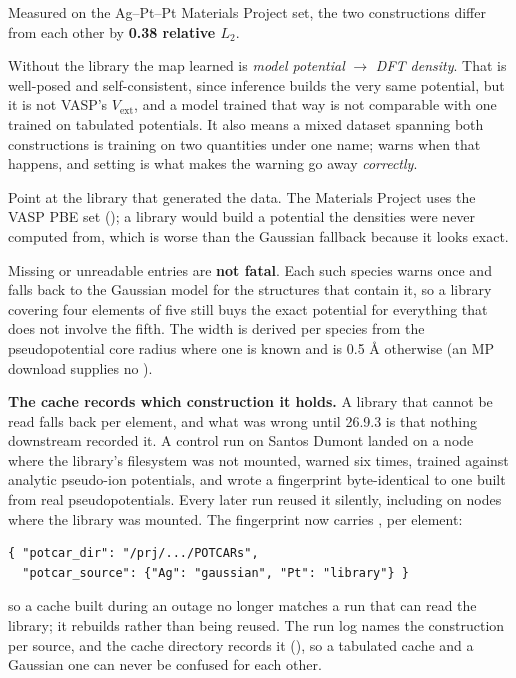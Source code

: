 Measured on the Ag--Pt--Pt Materials Project set, the two constructions differ from each other by \textbf{0.38 relative $L_2$}.

Without the library the map learned is \emph{model potential} $\to$ \emph{DFT density}. That is well-posed and self-consistent, since inference builds the very same potential, but it is not VASP's $V_\mathrm{ext}$, and a model trained that way is not comparable with one trained on tabulated potentials. It also means a mixed dataset spanning both constructions is training on two quantities under one name;  warns when that happens, and setting  is what makes the warning go away \emph{correctly}.

\begin{pwarn}
Point at the library that generated the data. The Materials Project uses the VASP PBE set (); a  library would build a potential the densities were never computed from, which is worse than the Gaussian fallback because it looks exact.
\end{pwarn}

Missing or unreadable entries are \textbf{not fatal}. Each such species warns once and falls back to the Gaussian model for the structures that contain it, so a library covering four elements of five still buys the exact potential for everything that does not involve the fifth. The width is derived per species from the pseudopotential core radius where one is known and is 0.5 \AA{} otherwise (an MP download supplies no ).

\textbf{The cache records which construction it holds.} A library that cannot be read falls back per element, and what was wrong until 26.9.3 is that nothing downstream recorded it. A control run on Santos Dumont landed on a node where the library's filesystem was not mounted, warned six times, trained against analytic pseudo-ion potentials, and wrote a fingerprint byte-identical to one built from real pseudopotentials. Every later run reused it silently, including on nodes where the library was mounted. The fingerprint now carries , per element:

\begin{lstlisting}
{ "potcar_dir": "/prj/.../POTCARs",
  "potcar_source": {"Ag": "gaussian", "Pt": "library"} }
\end{lstlisting}

so a cache built during an outage no longer matches a run that can read the library; it rebuilds rather than being reused. The run log names the construction per source, and the cache directory records it (), so a tabulated cache and a Gaussian one can never be confused for each other.

